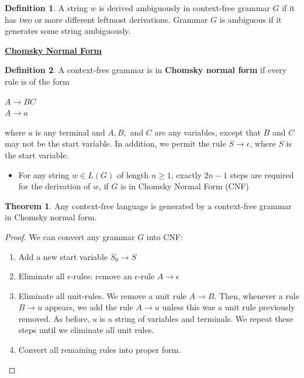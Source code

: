 \documentclass[11pt]{article}
\theoremstyle{definition}
\newtheorem{defn}{Definition}[section]
\newtheorem{thm}{Theorem}[section]
\begin{document}
\begin{defn}
A string $w$ is derived ambiguously in context-free grammar $G$ if it has two or more different leftmost derivations. Grammar $G$ is ambiguous if it generates some string ambiguously.
\end{defn}
\textbf{\underline{Chomsky Normal Form}}
\begin{defn}
A context-free grammar is in \textbf{Chomsky normal form} if every rule is
of the form
    \begin{center}
        $A \to BC$\\
        $A \to a$
    \end{center}
where $a$ is any terminal and $A, B,$ and $C$ are any variables, except that $B$ and $C$ may not be the start variable. In addition, we permit the rule $S\to \epsilon$, where $S$ is the start variable.
\end{defn}
\begin{itemize}[leftmargin=*]
    \item For any string $w\in L(G)$ of length $n\geq 1$, exactly $2n-1$ steps are required for the derivation of $w$, if $G$ is in Chomsky Normal Form (CNF)
\end{itemize}
\begin{thm}
    Any context-free language is generated by a context-free grammar in Chomsky
normal form.
\end{thm}
\begin{proof}
We can convert any grammar $G$ into CNF:
\begin{enumerate}
    \item Add a new start variable $S_0\to S$
    \item Eliminate all $\epsilon$-rules: remove an $\epsilon$-rule $A\to \epsilon$
    \item Eliminate all unit-rules. We remove a unit rule $A \to B$. Then, whenever a rule $B \to u$ appears, we add the rule $A \to u$ unless this was a unit rule previously removed. As before, $u$ is a string of variables and terminals. We repeat these steps until we eliminate all unit rules.
    \item Convert all remaining rules into proper form.
\end{enumerate}
\end{proof}
\end{document}
